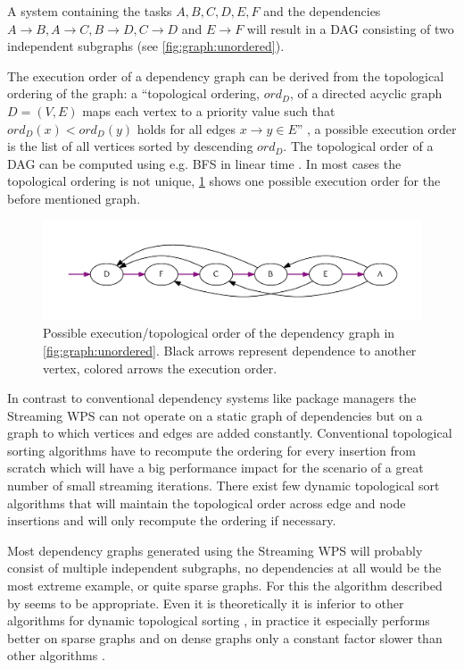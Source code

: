     A system containing the tasks $A, B, C, D, E, F$ and the dependencies $A\rightarrow B, A\rightarrow C, B\rightarrow D, C\rightarrow D$ and $E\rightarrow F$ will result in a \ac{DAG} consisting of two independent subgraphs (see \cref{fig:graph:unordered}).

    The execution order of a dependency graph can be derived from the topological ordering of the graph: a ``topological ordering, $ord_D$, of a directed acyclic graph $D = (V, E)$ maps each vertex to a priority value such that $ord_{D}(x) < ord_{D}(y)$ holds for all edges $x \rightarrow y \in E$'' \citep{pearce2007dynamic}, a possible execution order is the list of all vertices sorted by descending $ord_D$. The topological order of a \ac{DAG} can be computed using e.g. \ac{BFS} in linear time \citep{cormen2001introduction}. In most cases the topological ordering is not unique, \cref{fig:graph:ordered} shows one possible execution order for the before mentioned graph.

    \begin{figure}[!htb]
      \centering
      \includegraphics[width=1\linewidth]{figures/ordered-graph.pdf} %
      \caption{\label{fig:graph:ordered}Possible execution/topological order of the dependency graph in \cref{fig:graph:unordered}. Black arrows represent dependence to another vertex, colored arrows the execution order.}
    \end{figure}

    In contrast to conventional dependency systems like package managers the Streaming \ac{WPS} can not operate on a static graph of dependencies but on a graph to which vertices and edges are added constantly. Conventional topological sorting algorithms have to recompute the ordering for every insertion from scratch which will have a big performance impact for the scenario of a great number of small streaming iterations. There exist few dynamic topological sort algorithms that will maintain the topological order across edge and node insertions and will only recompute the ordering if necessary.

    Most dependency graphs generated using the Streaming \ac{WPS} will probably consist of multiple independent subgraphs, no dependencies at all would be the most extreme example, or quite sparse graphs. For this the algorithm described by \citet{pearce2007dynamic} seems to be appropriate. Even it is theoretically it is inferior to other algorithms for dynamic topological sorting \citep[e.g. ][]{alpern1990incremental,marchetti1996maintaining}, in practice it especially performs better on sparse graphs and on dense graphs only a constant factor slower than other algorithms \citep{pearce2007dynamic}. %

